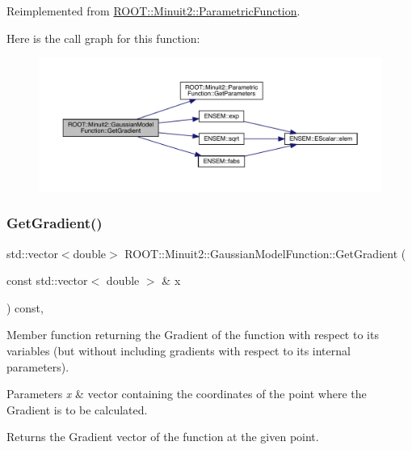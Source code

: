 Reimplemented from \mbox{\hyperlink{classROOT_1_1Minuit2_1_1ParametricFunction_abe6cfa5c64c578101da1d6fcecfb2249}{R\+O\+O\+T\+::\+Minuit2\+::\+Parametric\+Function}}.

Here is the call graph for this function\+:
\nopagebreak
\begin{figure}[H]
\begin{center}
\leavevmode
\includegraphics[width=350pt]{d4/df6/classROOT_1_1Minuit2_1_1GaussianModelFunction_ac81a3c5531a291b8a9c3af533de07195_cgraph}
\end{center}
\end{figure}
\mbox{\label{classROOT_1_1Minuit2_1_1GaussianModelFunction_ac81a3c5531a291b8a9c3af533de07195}} 
\subsubsection{\texorpdfstring{GetGradient()}{GetGradient()}\hspace{0.1cm}{\footnotesize\ttfamily [2/2]}}
{\footnotesize\ttfamily std\+::vector$<$double$>$ R\+O\+O\+T\+::\+Minuit2\+::\+Gaussian\+Model\+Function\+::\+Get\+Gradient (\begin{DoxyParamCaption}\item[{const std\+::vector$<$ double $>$ \&}]{x }\end{DoxyParamCaption}) const\hspace{0.3cm}{\ttfamily [inline]}, {\ttfamily [virtual]}}

Member function returning the Gradient of the function with respect to its variables (but without including gradients with respect to its internal parameters).


\begin{DoxyParams}{Parameters}
{\em x} & vector containing the coordinates of the point where the Gradient is to be calculated.\\
\hline
\end{DoxyParams}
\begin{DoxyReturn}{Returns}
the Gradient vector of the function at the given point. 
\end{DoxyReturn}


